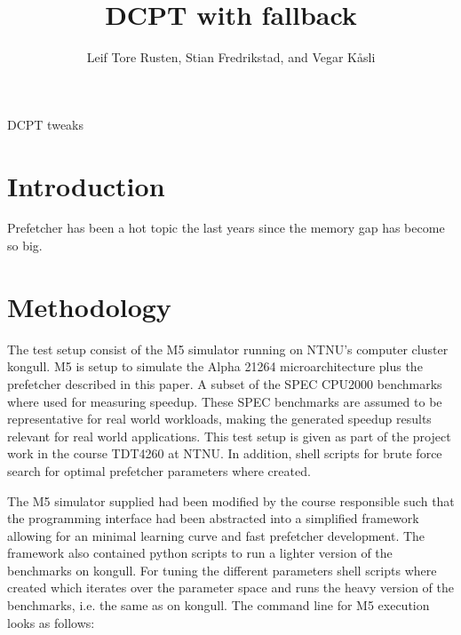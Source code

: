 \documentclass[12pt,journal,compsoc]{IEEEtran}
\begin{document}
\title{DCPT with fallback}
\author{Leif Tore Rusten,
        Stian Fredrikstad,
        and Vegar K\aa sli}

%
{DCPT tweaks}


\maketitle
\IEEEdisplaynotcompsoctitleabstractindextext
\IEEEpeerreviewmaketitle

\section{Introduction}
Prefetcher has been a hot topic the last years since the memory gap has become so big.

\section{Methodology}
The test setup consist of the M5 simulator running on NTNU's computer
cluster kongull. M5 is setup to simulate the Alpha 21264 microarchitecture
plus the prefetcher described in this paper. A subset of the SPEC CPU2000
benchmarks where used for measuring speedup. These SPEC benchmarks are assumed
to be representative for real world workloads, making the generated speedup
results relevant for real world applications. This test setup is given
as part of the project work in the course TDT4260 at NTNU. In addition,
shell scripts for brute force search for optimal prefetcher parameters
where created.

The M5 simulator supplied had been modified by the course responsible such
that the programming interface had been abstracted into a simplified framework
allowing for an minimal learning curve and fast prefetcher development. The
framework also contained python scripts to run a lighter version of the
benchmarks on kongull. For tuning the different parameters shell scripts
where created which iterates over the parameter space and runs the heavy
version of the benchmarks, i.e. the same as on kongull. The command line
for M5 execution looks as follows:
\end{document}
